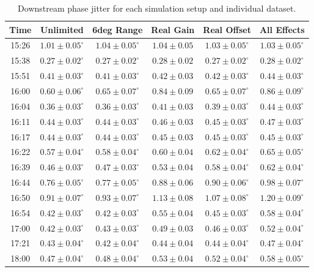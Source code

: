 \begin{table}
  \begin{center}
    \begin{tabular}{| c  c  c  c  c  c |}
	   \hline
       Time & Unlimited &  6deg Range &  Real Gain &  Real Offset &  All Effects \\ \hline
15:26 & \(1.01\pm0.05^\circ\) & \(1.04\pm0.05^\circ\) & \(1.04\pm0.05\) & \(1.03\pm0.05^\circ\) & \(1.03\pm0.05^\circ\) \\
15:38 & \(0.27\pm0.02^\circ\) & \(0.27\pm0.02^\circ\) & \(0.28\pm0.02\) & \(0.27\pm0.02^\circ\) & \(0.28\pm0.02^\circ\) \\
15:51 & \(0.41\pm0.03^\circ\) & \(0.41\pm0.03^\circ\) & \(0.42\pm0.03\) & \(0.42\pm0.03^\circ\) & \(0.44\pm0.03^\circ\) \\
16:00 & \(0.60\pm0.06^\circ\) & \(0.65\pm0.07^\circ\) & \(0.84\pm0.09\) & \(0.65\pm0.07^\circ\) & \(0.86\pm0.09^\circ\) \\
16:04 & \(0.36\pm0.03^\circ\) & \(0.36\pm0.03^\circ\) & \(0.41\pm0.03\) & \(0.39\pm0.03^\circ\) & \(0.44\pm0.03^\circ\) \\
16:11 & \(0.44\pm0.03^\circ\) & \(0.44\pm0.03^\circ\) & \(0.46\pm0.03\) & \(0.45\pm0.03^\circ\) & \(0.47\pm0.03^\circ\) \\
16:17 & \(0.44\pm0.03^\circ\) & \(0.44\pm0.03^\circ\) & \(0.45\pm0.03\) & \(0.45\pm0.03^\circ\) & \(0.45\pm0.03^\circ\) \\
16:22 & \(0.57\pm0.04^\circ\) & \(0.58\pm0.04^\circ\) & \(0.60\pm0.04\) & \(0.62\pm0.04^\circ\) & \(0.65\pm0.05^\circ\) \\
16:39 & \(0.46\pm0.03^\circ\) & \(0.47\pm0.03^\circ\) & \(0.53\pm0.04\) & \(0.58\pm0.04^\circ\) & \(0.62\pm0.04^\circ\) \\
16:44 & \(0.76\pm0.05^\circ\) & \(0.77\pm0.05^\circ\) & \(0.88\pm0.06\) & \(0.90\pm0.06^\circ\) & \(0.98\pm0.07^\circ\) \\
16:50 & \(0.91\pm0.07^\circ\) & \(0.93\pm0.07^\circ\) & \(1.13\pm0.08\) & \(1.07\pm0.08^\circ\) & \(1.20\pm0.09^\circ\) \\
16:54 & \(0.42\pm0.03^\circ\) & \(0.42\pm0.03^\circ\) & \(0.55\pm0.04\) & \(0.45\pm0.03^\circ\) & \(0.58\pm0.04^\circ\) \\
17:00 & \(0.42\pm0.03^\circ\) & \(0.43\pm0.03^\circ\) & \(0.49\pm0.03\) & \(0.46\pm0.03^\circ\) & \(0.52\pm0.04^\circ\) \\
17:21 & \(0.43\pm0.04^\circ\) & \(0.42\pm0.04^\circ\) & \(0.44\pm0.04\) & \(0.44\pm0.04^\circ\) & \(0.47\pm0.04^\circ\) \\
18:00 & \(0.47\pm0.04^\circ\) & \(0.48\pm0.04^\circ\) & \(0.53\pm0.04\) & \(0.52\pm0.04^\circ\) & \(0.58\pm0.05^\circ\) \\ \hline
    \end{tabular}
    \caption{Downstream phase jitter for each simulation setup and individual dataset.}
  	\label{t:LongFFIndivSim}
  \end{center}
\end{table}


